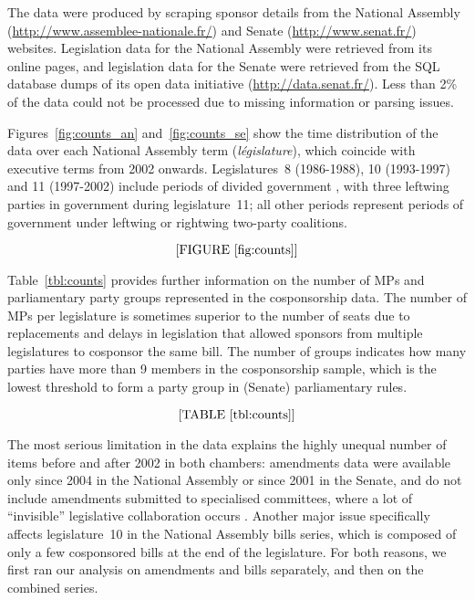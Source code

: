 The data were produced by scraping sponsor details from the National Assembly (\url{http://www.assemblee-nationale.fr/}) and Senate (\url{http://www.senat.fr/}) websites. Legislation data for the National Assembly were retrieved from its online pages, and legislation data for the Senate were retrieved from the SQL database dumps of its open data initiative (\url{http://data.senat.fr/}). Less than 2\% of the data could not be processed due to missing information or parsing issues.%

Figures~\ref{fig:counts_an} and~\ref{fig:counts_se} show the time distribution of the data over each National Assembly term (\emph{législature}), which coincide with executive terms from 2002 onwards. Legislatures~8 (1986-1988), 10 (1993-1997) and 11 (1997-2002) include periods of divided government \citep{BaumgartnerBrouard2014-G}, with three leftwing parties in government during legislature~11; all other periods represent periods of government under leftwing or rightwing two-party coalitions.%

$$\textrm{[FIGURE~\ref{fig:counts}]}$$

Table~\ref{tbl:counts} provides further information on the number of MPs and parliamentary party groups represented in the cosponsorship data. The number of MPs per legislature is sometimes superior to the number of seats due to replacements and delays in legislation that allowed sponsors from multiple legislatures to cosponsor the same bill. The number of groups indicates how many parties have more than 9 members in the cosponsorship sample, which is the lowest threshold to form a party group in (Senate) parliamentary rules.%

$$\textrm{[TABLE~\ref{tbl:counts}]}$$

The most serious limitation in the data explains the highly unequal number of items before and after 2002  in both chambers: amendments data were available only since 2004 in the National Assembly or since 2001 in the Senate, and do not include amendments submitted to specialised committees, where a lot of ``invisible'' legislative collaboration occurs \citep[p.~357]{Kerrouche2006-JLS}. Another major issue specifically affects legislature~10 in the National Assembly bills series, which is composed of only a few cosponsored bills at the end of the legislature. For both reasons, we first ran our analysis on amendments and bills separately, and then on the combined series.%

